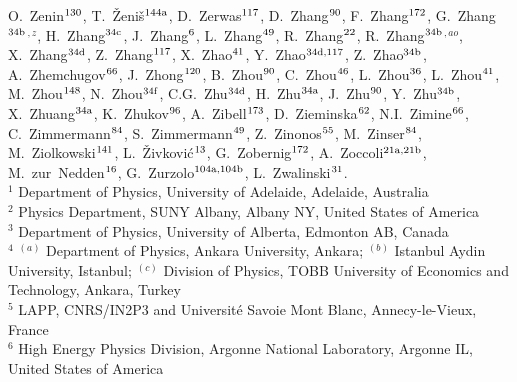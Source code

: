 \begin{flushleft}
O.~Zenin$^\textrm{\scriptsize 130}$,
T.~\v{Z}eni\v{s}$^\textrm{\scriptsize 144a}$,
D.~Zerwas$^\textrm{\scriptsize 117}$,
D.~Zhang$^\textrm{\scriptsize 90}$,
F.~Zhang$^\textrm{\scriptsize 172}$,
G.~Zhang$^\textrm{\scriptsize 34b}$$^{,z}$,
H.~Zhang$^\textrm{\scriptsize 34c}$,
J.~Zhang$^\textrm{\scriptsize 6}$,
L.~Zhang$^\textrm{\scriptsize 49}$,
R.~Zhang$^\textrm{\scriptsize 22}$,
R.~Zhang$^\textrm{\scriptsize 34b}$$^{,ao}$,
X.~Zhang$^\textrm{\scriptsize 34d}$,
Z.~Zhang$^\textrm{\scriptsize 117}$,
X.~Zhao$^\textrm{\scriptsize 41}$,
Y.~Zhao$^\textrm{\scriptsize 34d,117}$,
Z.~Zhao$^\textrm{\scriptsize 34b}$,
A.~Zhemchugov$^\textrm{\scriptsize 66}$,
J.~Zhong$^\textrm{\scriptsize 120}$,
B.~Zhou$^\textrm{\scriptsize 90}$,
C.~Zhou$^\textrm{\scriptsize 46}$,
L.~Zhou$^\textrm{\scriptsize 36}$,
L.~Zhou$^\textrm{\scriptsize 41}$,
M.~Zhou$^\textrm{\scriptsize 148}$,
N.~Zhou$^\textrm{\scriptsize 34f}$,
C.G.~Zhu$^\textrm{\scriptsize 34d}$,
H.~Zhu$^\textrm{\scriptsize 34a}$,
J.~Zhu$^\textrm{\scriptsize 90}$,
Y.~Zhu$^\textrm{\scriptsize 34b}$,
X.~Zhuang$^\textrm{\scriptsize 34a}$,
K.~Zhukov$^\textrm{\scriptsize 96}$,
A.~Zibell$^\textrm{\scriptsize 173}$,
D.~Zieminska$^\textrm{\scriptsize 62}$,
N.I.~Zimine$^\textrm{\scriptsize 66}$,
C.~Zimmermann$^\textrm{\scriptsize 84}$,
S.~Zimmermann$^\textrm{\scriptsize 49}$,
Z.~Zinonos$^\textrm{\scriptsize 55}$,
M.~Zinser$^\textrm{\scriptsize 84}$,
M.~Ziolkowski$^\textrm{\scriptsize 141}$,
L.~\v{Z}ivkovi\'{c}$^\textrm{\scriptsize 13}$,
G.~Zobernig$^\textrm{\scriptsize 172}$,
A.~Zoccoli$^\textrm{\scriptsize 21a,21b}$,
M.~zur~Nedden$^\textrm{\scriptsize 16}$,
G.~Zurzolo$^\textrm{\scriptsize 104a,104b}$,
L.~Zwalinski$^\textrm{\scriptsize 31}$.
\bigskip
\\
$^{1}$ Department of Physics, University of Adelaide, Adelaide, Australia\\
$^{2}$ Physics Department, SUNY Albany, Albany NY, United States of America\\
$^{3}$ Department of Physics, University of Alberta, Edmonton AB, Canada\\
$^{4}$ $^{(a)}$ Department of Physics, Ankara University, Ankara; $^{(b)}$ Istanbul Aydin University, Istanbul; $^{(c)}$ Division of Physics, TOBB University of Economics and Technology, Ankara, Turkey\\
$^{5}$ LAPP, CNRS/IN2P3 and Universit{\'e} Savoie Mont Blanc, Annecy-le-Vieux, France\\
$^{6}$ High Energy Physics Division, Argonne National Laboratory, Argonne IL, United States of America\\

\end{flushleft}
